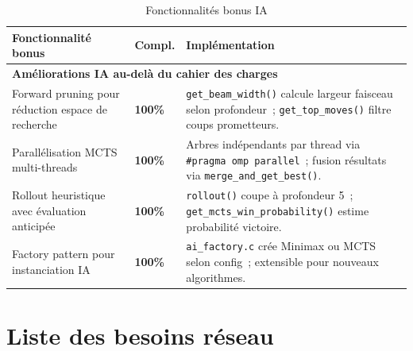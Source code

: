 \documentclass[a4paper]{article}
\begin{document}
 
\begin{table}[H]
\centering
\renewcommand{\arraystretch}{1.4}
\begin{tabular}{|p{6cm}|p{1.5cm}|p{8cm}|}
\hline
\textbf{Fonctionnalité bonus} & \textbf{Compl.} & \textbf{Implémentation} \\
\hline
\multicolumn{3}{|l|}{\textbf{Améliorations IA au-delà du cahier des charges}} \\
\hline
Forward pruning pour réduction espace de recherche
& \textbf{100\%}
& \texttt{get\_beam\_width()} calcule largeur faisceau selon profondeur~; \texttt{get\_top\_moves()} filtre coups prometteurs. \\
\hline
Parallélisation MCTS multi-threads
& \textbf{100\%}
& Arbres indépendants par thread via \texttt{\#pragma omp parallel}~; fusion résultats via \texttt{merge\_and\_get\_best()}. \\
\hline
Rollout heuristique avec évaluation anticipée
& \textbf{100\%}
& \texttt{rollout()} coupe à profondeur 5~; \texttt{get\_mcts\_win\_probability()} estime probabilité victoire. \\
\hline
Factory pattern pour instanciation IA
& \textbf{100\%}
& \texttt{ai\_factory.c} crée Minimax ou MCTS selon config~; extensible pour nouveaux algorithmes. \\
\hline
\end{tabular}
\caption{Fonctionnalités bonus IA}
\label{tab:bonus-ia}
\end{table}
 

 
 
\section{Liste des besoins réseau}
\label{ann:besoins-reseau}
 
 
\end{document}
